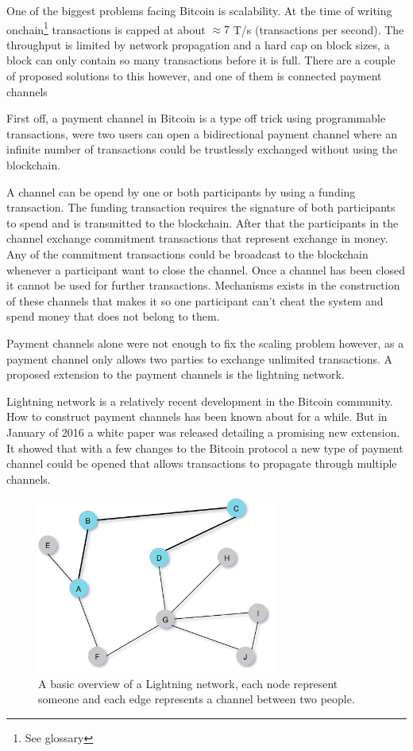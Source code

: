 
One of the biggest problems facing Bitcoin is scalability. At the time of writing
onchain\footnote{See glossary} transactions is capped at about $\approx 7$ T/s (transactions per second).\cite{scaling}
The throughput is limited by network propagation and a hard cap on block sizes, a block
can only contain so many transactions before it is full. There are a couple of
proposed solutions to this however, and one of them is connected payment channels

First off, a payment channel in Bitcoin is a type off trick using programmable transactions, 
were two users can open a bidirectional payment channel where an infinite number of transactions 
could be trustlessly exchanged without using the blockchain. 

A channel can be opend by one or both participants by using a funding transaction. The funding 
transaction requires the signature of both participants to spend and is transmitted to the blockchain. 
After that the participants in the channel exchange commitment transactions that represent exchange in money.
Any of the commitment transactions could be broadcast to the blockchain whenever a participant 
want to close the channel. Once a channel has been closed it cannot be used for further transactions.
Mechanisms exists in the construction of these channels that makes it so one participant 
can't cheat the system and spend money that does not belong to them.

Payment channels alone were not enough to fix the scaling problem however, as a payment channel 
only allows two parties to exchange unlimited transactions. A proposed extension to the 
payment channels is the lightning network.

Lightning network is a relatively recent development in the Bitcoin community.
How to construct payment channels has been known about for a while. But in
January of 2016 a white paper was released detailing a promising new extension.\cite{lightningnetwork_2019}
It showed that with a few changes to the Bitcoin protocol a new type of
payment channel could be opened that allows transactions to propagate through multiple channels.\cite{lightningnetwork_2019}

\begin{figure}[H]
	\centering
	\includegraphics[width=0.70\textwidth]{introduction/images/mesh_network.png}
	\caption{A basic overview of a Lightning network, each node represent someone
	and each edge represents a channel between two people.}
	\label{fig:mesh}
\end{figure}

